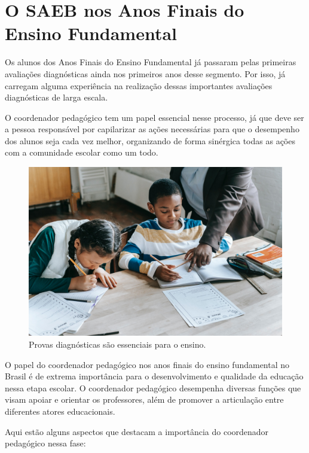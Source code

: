 \captionsetup{justification=raggedright, singlelinecheck=false}

\section{O SAEB nos Anos Finais do Ensino
Fundamental}

Os alunos dos Anos Finais do Ensino Fundamental já passaram pelas primeiras
avaliações diagnósticas ainda nos primeiros anos desse segmento. Por
isso, já carregam alguma experiência na realização dessas importantes avaliações diagnósticas de larga escala. 

O coordenador pedagógico tem um papel essencial nesse processo, já que
deve ser a pessoa responsável por capilarizar as ações necessárias para que o desempenho dos alunos seja cada vez melhor, organizando de forma sinérgica todas as ações com a comunidade escolar como um todo.

\begin{figure}
\centering
\includegraphics[width=\textwidth]{./imgs/Imagem001.jpg}
\caption{Provas diagnósticas são essenciais para o ensino.}
\end{figure}

O papel do coordenador pedagógico nos anos finais do ensino fundamental no Brasil é de extrema importância para o desenvolvimento e qualidade da educação nessa etapa escolar. O coordenador pedagógico desempenha diversas funções que visam apoiar e orientar os professores, além de promover a articulação entre diferentes atores educacionais.

Aqui estão alguns aspectos que destacam a importância do coordenador pedagógico nessa fase:

